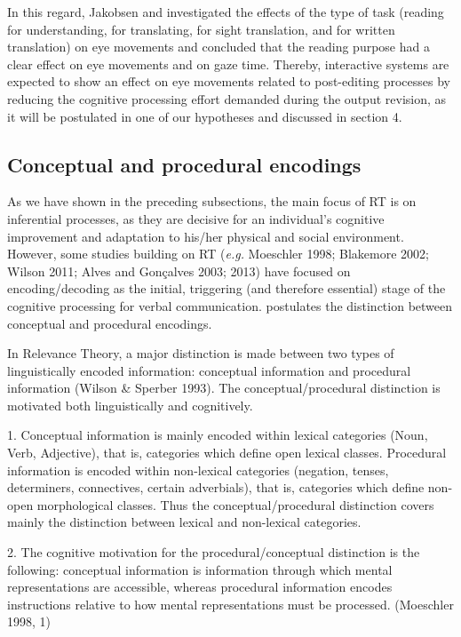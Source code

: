 \documentclass[output=paper]{langsci/langscibook}
\begin{document}
In this regard, Jakobsen and \citet{Jensen2008} investigated the effects of the type of task (reading for understanding, for translating, for sight translation, and for written translation) on eye movements and concluded that the reading purpose had a clear effect on eye movements and on gaze time. Thereby, interactive systems are expected to show an effect on eye movements related to post-editing processes by reducing the cognitive processing effort demanded during the output revision, as it will be postulated in one of our hypotheses and discussed in section 4.


\subsection{Conceptual and procedural encodings}

As we have shown in the preceding subsections, the main focus of RT is on inferential processes, as they are decisive for an individual’s cognitive improvement and adaptation to his/her physical and social environment. However, some studies building on RT (\textit{e.g. }Moeschler 1998; Blakemore 2002; Wilson 2011; Alves and Gonçalves 2003; 2013) have focused on encoding/decoding as the initial, triggering (and therefore essential) stage of the cognitive processing for verbal communication. \citet{Moeschler1998} postulates the distinction between conceptual and procedural encodings.


In Relevance Theory, a major distinction is made between two types of linguistically encoded information: conceptual information and procedural information (Wilson \& Sperber 1993). The conceptual/procedural distinction is motivated both linguistically and cognitively.



1. Conceptual information is mainly encoded within lexical categories (Noun, Verb, Adjective), that is, categories which define open lexical classes. Procedural information is encoded within non-lexical categories (negation, tenses, determiners, connectives, certain adverbials), that is, categories which define non-open morphological classes. Thus the conceptual/procedural distinction covers mainly the distinction between lexical and non-lexical categories.



2. The cognitive motivation for the procedural/conceptual distinction is the following: conceptual information is information through which mental representations are accessible, whereas procedural information encodes instructions relative to how mental representations must be processed. (Moeschler 1998, 1)
\end{document}
